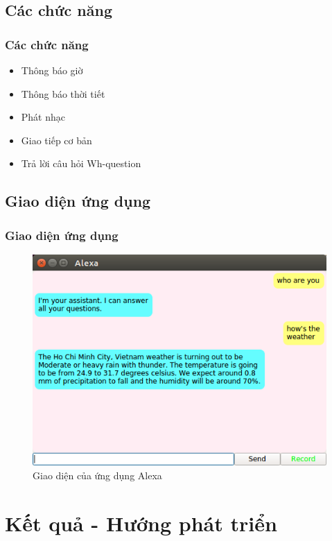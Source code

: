 \documentclass{beamer}
\begin{document}
\subsection{Các chức năng}
\begin{frame}
\frametitle{Các chức năng}
\begin{itemize}
    \item Thông báo giờ
    \item Thông báo thời tiết
    \item Phát nhạc
    \item Giao tiếp cơ bản
    \item Trả lời câu hỏi Wh-question
\end{itemize}
\end{frame}

\subsection{Giao diện ứng dụng}
\begin{frame}
\frametitle{Giao diện ứng dụng}
\begin{figure}
\centering
\includegraphics[scale=0.45]{interface}
\caption{Giao diện của ứng dụng Alexa}
\end{figure}
\end{frame}

\section{Kết quả - Hướng phát triển}
\end{document}
